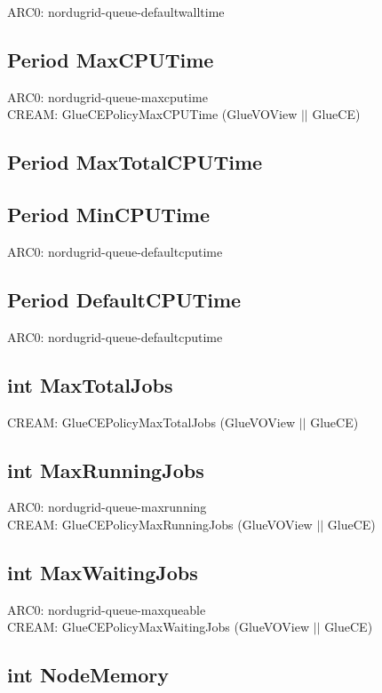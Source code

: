 \documentclass{book}
\begin{document}
ARC0: nordugrid-queue-defaultwalltime

\subsection*{Period MaxCPUTime}

ARC0: nordugrid-queue-maxcputime \\
CREAM: GlueCEPolicyMaxCPUTime (GlueVOView $||$ GlueCE)

\subsection*{Period MaxTotalCPUTime}

\subsection*{Period MinCPUTime}

ARC0: nordugrid-queue-defaultcputime

\subsection*{Period DefaultCPUTime}

ARC0: nordugrid-queue-defaultcputime

\subsection*{int MaxTotalJobs}

CREAM: GlueCEPolicyMaxTotalJobs (GlueVOView $||$ GlueCE)

\subsection*{int MaxRunningJobs}

ARC0: nordugrid-queue-maxrunning \\
CREAM: GlueCEPolicyMaxRunningJobs (GlueVOView $||$ GlueCE)

\subsection*{int MaxWaitingJobs}

ARC0: nordugrid-queue-maxqueable \\
CREAM: GlueCEPolicyMaxWaitingJobs (GlueVOView $||$ GlueCE)

\subsection*{int NodeMemory}
\end{document}
